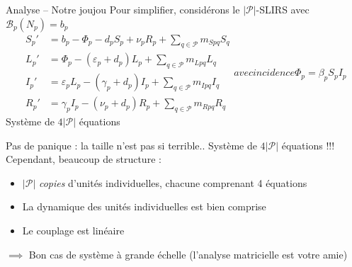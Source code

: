 \documentclass[aspectratio=169]{beamer}\usepackage[]{graphicx}\usepackage[]{xcolor}
\begin{document}

\begin{frame}{Analyse -- Notre joujou}
Pour simplifier, considérons le $|\mathcal{P}|$-SLIRS avec $\mathcal{B}_p(N_p)=b_p$
\begin{subequations}
	\label{sys:pSLIRS_toy}
	\begin{align}
		S_{p}' &=b_p-\Phi_p-d_pS_p+\nu_pR_p
		+\textstyle{\sum_{q\in\mathcal{P}}} m_{Spq}S_{q} 
		\label{sys:pSLIRS_toy_dS} \\
		L_{p}' &=\Phi_p-\left( \varepsilon_{p}+d_{p}\right)L_{p}
		+\textstyle{\sum_{q\in\mathcal{P}}} m_{Lpq}L_{q} 
		\label{sys:pSLIRS_toy_dL} \\
		I_{p}' &=\varepsilon_pL_p-(\gamma_p+d_p)I_p
		+\textstyle{\sum_{q\in\mathcal{P}}} m_{Ipq}I_{q} 
		\label{sys:pSLIRS_toy_dI} \\
		R_{p}' &=\gamma _{p}I_{p}-\left(\nu_{p}+d_{p}\right)R_{p}
		+\textstyle{\sum_{q\in\mathcal{P}}} m_{Rpq}R_{q}
		\label{sys:pSLIRS_toy_dR} 
	\end{align}
	avec incidence
	\begin{equation}
		\Phi_p=\beta_pS_pI_p
		\label{sys:pSLIRS_toy_incidence} 
	\end{equation}			
\end{subequations}
\vfill
Système de $4|\mathcal{P}|$ équations
\end{frame}

\begin{frame}{Pas de panique : la taille n'est pas si terrible..}
Système de $4|\mathcal{P}|$ équations !!!
\vfill
Cependant, beaucoup de structure : 
\begin{itemize}
	\item $|\mathcal{P}|$ \emph{copies} d'unités individuelles, chacune comprenant 4 équations
	\item La dynamique des unités individuelles est bien comprise
	\item Le couplage est linéaire
\end{itemize}
\vfill
$\implies$ Bon cas de système à grande échelle
\vfill
(l'analyse matricielle est votre amie)
\end{frame}
\end{document}

